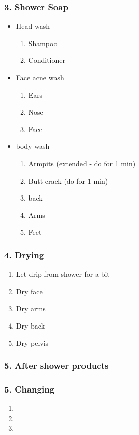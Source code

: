 \begin{frame}
\frametitle{3. Shower Soap  }
\begin{itemize}
\item Head wash
\begin{enumerate}
\item \tiny Shampoo
\item \tiny Conditioner
\end{enumerate}
\item Face acne wash
\begin{enumerate}
\item \tiny Ears
\item \tiny Nose
\item \tiny Face
\end{enumerate}
\item body wash
\begin{enumerate}
\item \tiny Armpits (extended - do for 1 min)
\item \tiny Butt crack (do for 1 min)
\item \tiny back
\item \tiny Arms
\item \tiny Feet
\end{enumerate}
\end{itemize}
\end{frame}

\begin{frame}
\frametitle{4. Drying }
\begin {enumerate}
\item \small Let drip from shower for a bit
\item \small Dry face
\item \small Dry arms
\item \small Dry back
\item \small Dry pelvis
\end{enumerate}
\end{frame}

\begin{frame}
\frametitle{5. After shower products }
\item \small
\item \small
\item \small
\end{frame}

\begin{frame}
\frametitle{5. Changing }
\begin{enumerate}
\item \small
\item \small
\item \small
\end{enumerate}
\end{frame}
